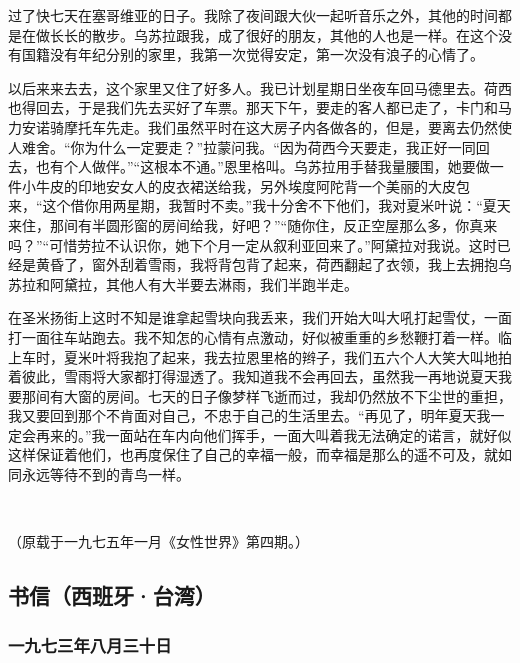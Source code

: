 \par 过了快七天在塞哥维亚的日子。我除了夜间跟大伙一起听音乐之外，其他的时间都是在做长长的散步。乌苏拉跟我，成了很好的朋友，其他的人也是一样。在这个没有国籍没有年纪分别的家里，我第一次觉得安定，第一次没有浪子的心情了。
\par 以后来来去去，这个家里又住了好多人。我已计划星期日坐夜车回马德里去。荷西也得回去，于是我们先去买好了车票。那天下午，要走的客人都已走了，卡门和马力安诺骑摩托车先走。我们虽然平时在这大房子内各做各的，但是，要离去仍然使人难舍。“你为什么一定要走？”拉蒙问我。“因为荷西今天要走，我正好一同回去，也有个人做伴。”“这根本不通。”恩里格叫。乌苏拉用手替我量腰围，她要做一件小牛皮的印地安女人的皮衣裙送给我，另外埃度阿陀背一个美丽的大皮包来，“这个借你用两星期，我暂时不卖。”我十分舍不下他们，我对夏米叶说：“夏天来住，那间有半圆形窗的房间给我，好吧？”“随你住，反正空屋那么多，你真来吗？”“可惜劳拉不认识你，她下个月一定从叙利亚回来了。”阿黛拉对我说。这时已经是黄昏了，窗外刮着雪雨，我将背包背了起来，荷西翻起了衣领，我上去拥抱乌苏拉和阿黛拉，其他人有大半要去淋雨，我们半跑半走。
\par 在圣米扬街上这时不知是谁拿起雪块向我丢来，我们开始大叫大吼打起雪仗，一面打一面往车站跑去。我不知怎的心情有点激动，好似被重重的乡愁鞭打着一样。临上车时，夏米叶将我抱了起来，我去拉恩里格的辫子，我们五六个人大笑大叫地拍着彼此，雪雨将大家都打得湿透了。我知道我不会再回去，虽然我一再地说夏天我要那间有大窗的房间。七天的日子像梦样飞逝而过，我却仍然放不下尘世的重担，我又要回到那个不肯面对自己，不忠于自己的生活里去。“再见了，明年夏天我一定会再来的。”我一面站在车内向他们挥手，一面大叫着我无法确定的诺言，就好似这样保证着他们，也再度保住了自己的幸福一般，而幸福是那么的遥不可及，就如同永远等待不到的青鸟一样。
\par  
\par （原载于一九七五年一月《女性世界》第四期。）




\subsection{书信（西班牙·台湾）}



\subsubsection{一九七三年八月三十日}

